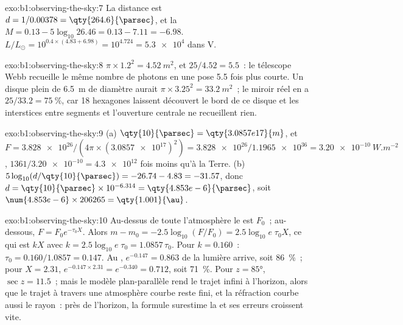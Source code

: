 \begin{solution}{exo:b1:observing-the-sky:7}
La distance est $d = 1/0.00378 = \qty{264.6}{\parsec}$, et la 
$M = 0.13 - 5\log_{10}26.46 = 0.13 - 7.11 = -6.98$. $L/L_\odot = 10^{0.4\times(4.83 + 6.98)} =
10^{4.724} = \num{5.3e4}$ dans V.
\end{solution}

\begin{solution}{exo:b1:observing-the-sky:8}
$\pi\times1.2^2 = \qty{4.52}{m^2}$, et $25/4.52 = 5.5$~: le télescope Webb
recueille le même nombre de photons en une pose 5.5 fois plus courte. Un
disque plein de \qty{6.5}{m} de diamètre aurait $\pi\times3.25^2 = \qty{33.2}{m^2}$~;
le miroir réel en a $25/33.2 = \qty{75}{\percent}$, car 18 hexagones laissent
découvert le bord de ce disque et les interstices entre segments et l'ouverture
centrale ne recueillent rien.
\end{solution}

\begin{solution}{exo:b1:observing-the-sky:9}
(a) $\qty{10}{\parsec} = \qty{3.0857e17}{m}$, et $F = \num{3.828e26}/(4\pi
\times(\num{3.0857e17})^2) = \num{3.828e26}/\num{1.1965e36} =
\qty{3.20e-10}{W.m^{-2}}$, $1361/\num{3.20e-10} = \num{4.3e12}$ fois moins qu'à
la Terre.
(b) $5\log_{10}(d/\qty{10}{\parsec}) = -26.74 - 4.83 = -31.57$, donc
$d = \qty{10}{\parsec}\times10^{-6.314} = \qty{4.853e-6}{\parsec}$, soit
$\num{4.853e-6}\times206265 = \qty{1.001}{\au}$.
\end{solution}

\begin{solution}{exo:b1:observing-the-sky:10}
Au-dessus de toute l'atmosphère le  est $F_0$~; au-dessous, $F = F_0e^{-\tau_0X}$.
Alors $m - m_0 = -2.5\log_{10}(F/F_0) = 2.5\log_{10}e\;\tau_0X$, ce qui est $kX$
avec $k = 2.5\log_{10}e\;\tau_0 = 1.0857\,\tau_0$. Pour $k = 0.160$~:
$\tau_0 = 0.160/1.0857 = 0.147$. Au , $e^{-0.147} = 0.863$ de la lumière
arrive, soit \qty{86}{\percent}~; pour $X = 2.31$, $e^{-0.147\times2.31} =
e^{-0.340} = 0.712$, soit \qty{71}{\percent}. Pour $z = \ang{85}$, $\sec z =
11.5$~; mais le modèle plan-parallèle rend le trajet infini à l'horizon, alors
que le trajet à travers une atmosphère courbe reste fini, et la réfraction
courbe aussi le rayon~: près de l'horizon, la formule surestime la 
et ses erreurs croissent vite.
\end{solution}

